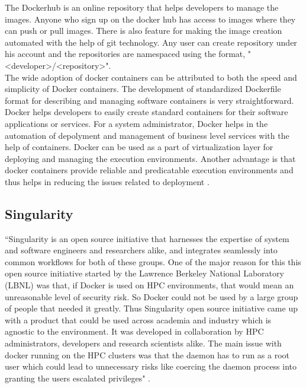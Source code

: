The Dockerhub is an online repository that helps developers to manage the images. Anyone who sign up on the docker hub has access to images where they can push or pull images. There is also feature for making the image creation automated with the help of git technology. Any user can create repository under his account and the repositories are namespaced using the format, "\textless developer\textgreater/\textless repository\textgreater"\cite{7742298}.\\

The wide adoption of docker containers can be attributed to both the speed and simplicity of Docker containers. The development of standardized Dockerfile format for describing and managing software containers is very straightforward. Docker helps developers to easily create standard containers for their software applications or services. For a system administrator, Docker helps in the automation of depolyment and management of business level services with the help of containers. Docker can be used as a part of virtualization layer for deploying and managing the execution environments. Another advantage is that docker containers provide reliable and predicatable execution environments and thus helps in reducing the issues related to deployment \cite{DBLP:journals/corr/MorrisVHM17}.

\subsection{Singularity}
``Singularity is an open source initiative that harnesses the expertise of system and software engineers and researchers alike, and integrates seamlessly into common workflows for both of these groups. One of the major reason for this this open source initiative started by the Lawrence Berkeley National Laboratory (LBNL) was that, if Docker is used on HPC environments, that would mean an unreasonable level of security risk. So Docker could not be used by a large group of people that needed it greatly. Thus Singularity open source initiative came up with a product that could be used across academia and industry which is agnostic to the environment. It was developed in collaboration by HPC administrators, developers and research scientists alike. The main issue with docker running on the HPC clusters was that the daemon has to run as a root user which could lead to unnecessary risks like coercing the daemon process into granting the users escalated privileges" \cite{10.1371/journal.pone.0177459}.\\

